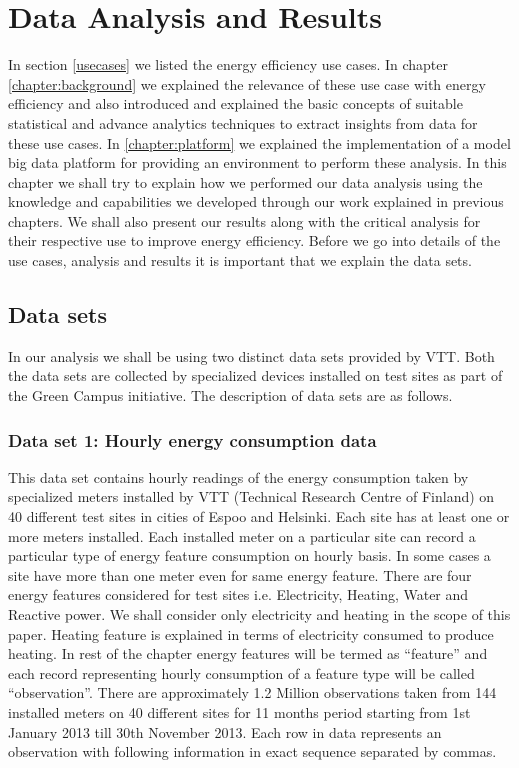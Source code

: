 \chapter{Data Analysis and Results}
\label{chapter:Analysis}

In section \ref{usecases} we listed the energy efficiency use cases. In chapter \ref{chapter:background} we explained the relevance of these use case with energy efficiency and also introduced and explained the basic concepts of suitable statistical and advance analytics techniques to extract insights from data for these use cases. In \ref{chapter:platform} we explained the implementation of a model big data platform for providing an environment to perform these analysis. In this chapter we shall try to explain how we performed our data analysis using the knowledge and capabilities we developed through our work explained in previous chapters. We shall also present our results along with the critical analysis for their respective use to improve energy efficiency. Before we go into details of the use cases, analysis and results it is important that we explain the data sets.

\section{Data sets}
In our analysis we shall be using two distinct data sets provided by VTT. Both the data sets are collected by specialized devices installed on test sites as part of the Green Campus initiative. The description of data sets are as follows.

\subsection{Data set 1: Hourly energy consumption data}
This data set contains hourly readings of the energy consumption taken by specialized meters installed by VTT (Technical Research Centre of Finland) on 40 different test sites in cities of Espoo and Helsinki. Each site has at least one or more meters installed. Each installed meter on a particular site can record a particular type of energy feature consumption on hourly basis. In some cases a site have more than one meter even for same energy feature. There are four energy features considered for test sites i.e. Electricity, Heating, Water and Reactive power. We shall consider only electricity and heating in the scope of this paper. Heating feature is explained in terms of electricity consumed to produce heating.  In rest of the chapter energy features will be termed as ``feature'' and each record representing hourly consumption of a feature type will be called ``observation''.
There are approximately 1.2 Million observations taken from 144 installed meters on 40 different sites for 11 months period starting from 1st January 2013 till 30th November 2013.  Each row in data represents an observation with following information in exact sequence separated by commas. 

